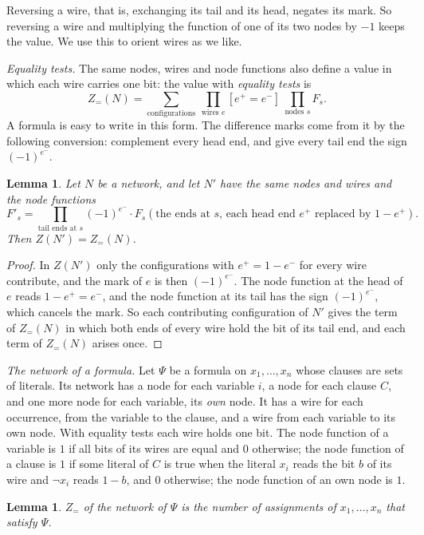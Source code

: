 \documentclass[11pt]{article}
\newtheorem{lemma}[theorem]{Lemma}
\begin{document}
Reversing a wire, that is, exchanging its tail and its head, negates its mark. So reversing a wire and multiplying the function of one of its two nodes by $-1$ keeps the value. We use this to orient wires as we like.

\emph{Equality tests.} The same nodes, wires and node functions also define a value in which each wire carries one bit: the value with \emph{equality tests} is
\[
Z_=(N)=\sum_{\text{configurations}}\ \prod_{\text{wires }e}[e^+=e^-]\ \prod_{\text{nodes }s}F_s .
\]
A formula is easy to write in this form. The difference marks come from it by the following conversion: complement every head end, and give every tail end the sign $(-1)^{e^-}$.

\begin{lemma}\label{lem:flip}
Let $N$ be a network, and let $N'$ have the same nodes and wires and the node functions
\[
F'_s=\prod_{\text{tail ends at }s}(-1)^{e^-}\cdot F_s(\text{the ends at $s$, each head end $e^+$ replaced by $1-e^+$}).
\]
Then $Z(N')=Z_=(N)$.
\end{lemma}

\begin{proof}
In $Z(N')$ only the configurations with $e^+=1-e^-$ for every wire contribute, and the mark of $e$ is then $(-1)^{e^-}$. The node function at the head of $e$ reads $1-e^+=e^-$, and the node function at its tail has the sign $(-1)^{e^-}$, which cancels the mark. So each contributing configuration of $N'$ gives the term of $Z_=(N)$ in which both ends of every wire hold the bit of its tail end, and each term of $Z_=(N)$ arises once.
\end{proof}

\emph{The network of a formula.} Let $\Psi$ be a formula on $x_1,\dots,x_n$ whose clauses are sets of literals. Its network has a node for each variable $i$, a node for each clause $C$, and one more node for each variable, its \emph{own} node. It has a wire for each occurrence, from the variable to the clause, and a wire from each variable to its own node. With equality tests each wire holds one bit. The node function of a variable is $1$ if all bits of its wires are equal and $0$ otherwise; the node function of a clause is $1$ if some literal of $C$ is true when the literal $x_i$ reads the bit $b$ of its wire and $\neg x_i$ reads $1-b$, and $0$ otherwise; the node function of an own node is $1$.

\begin{lemma}\label{lem:formula}
$Z_=$ of the network of $\Psi$ is the number of assignments of $x_1,\dots,x_n$ that satisfy $\Psi$.
\end{lemma}
\end{document}
